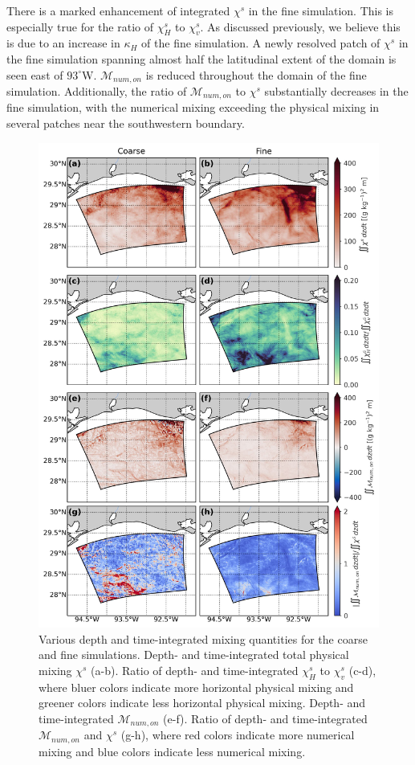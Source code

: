There is a marked enhancement of integrated $\chi^s$ in the fine simulation. This is especially true for the ratio of $\chi_H^s$ to $\chi_v^s$. As discussed previously, we believe this is due to an increase in $\kappa_H$ of the fine simulation. A newly resolved patch of $\chi^s$ in the fine simulation spanning almost half the latitudinal extent of the domain is seen east of $93^{\circ}$W. $\mathcal{M}_{num, on}$ is reduced throughout the domain of the fine simulation. Additionally, the ratio of $\mathcal{M}_{num, on}$ to $\chi^s$ substantially decreases in the fine simulation, with the numerical mixing exceeding the physical mixing in several patches near the southwestern boundary.

\begin{figure}
 \centerline{\includegraphics[width = 0.85\linewidth]{figures/james_2023/Figure6_dzdt_int.jpg}}
  \caption{Various depth and time-integrated mixing quantities for the coarse and fine simulations. Depth- and time-integrated total physical mixing $\chi^s$ (a-b). Ratio of depth- and time-integrated $\chi_H^s$ to $\chi_v^s$ (c-d), where bluer colors indicate more horizontal physical mixing and greener colors indicate less horizontal physical mixing. Depth- and time-integrated $\mathcal{M}_{num, on}$ (e-f). Ratio of depth- and time-integrated $\mathcal{M}_{num,on}$ and $\chi^s$ (g-h), where red colors indicate more numerical mixing and blue colors indicate less numerical mixing.}
  \label{fig:depth_integrated}
\end{figure}

